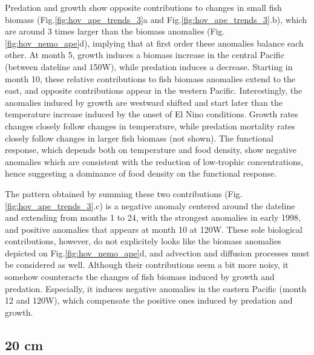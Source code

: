 Predation and growth show opposite contributions to changes in small fish biomass (Fig.\ref{fig:hov_ape_trends_3}a and Fig.\ref{fig:hov_ape_trends_3}.b), which are around 3 times larger than the biomass anomalies (Fig. \ref{fig:hov_nemo_ape}d), implying that at first order these anomalies balance each other. At month 5, growth induces a biomass increase in the central Pacific (between dateline and 150\degree{}W), while predation induces a decrease. Starting in month 10, these relative contributions to fish biomass anomalies extend to the east, and opposite contributions appear in the western Pacific. Interestingly, the anomalies induced by growth are westward shifted and start later than the temperature increase induced by the onset of El Nino conditions. Growth rates changes closely follow changes in temperature, while predation mortality rates closely follow changes in larger fish biomass (not shown). The functional response, which depends both on temperature and food density, show negative anomalies which are consistent with the reduction of low-trophic concentrations, hence suggesting a dominance of food density on the functional response.

The pattern obtained by summing these two contributions (Fig.\ref{fig:hov_ape_trends_3}.c) is a negative anomaly centered around the dateline and extending from months 1 to 24, with the strongest anomalies in early 1998, and positive anomalies that appears at month 10 at 120\degree{}W. These sole biological contributions, however, do not explicitely looks like the biomass anomalies depicted on Fig.\ref{fig:hov_nemo_ape}d, and advection and diffusion processes must be considered as well. Although their contributions seem a bit more noisy, it somehow counteracts the changes of fish biomass induced by growth and predation. Especially, it induces negative anomalies in the eastern Pacific (month 12 and 120\degree{}W), which compensate the positive ones induced by predation and growth. 

\subsection{20 cm}

